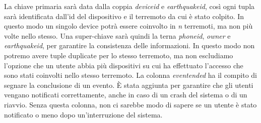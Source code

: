 \documentclass[main.tex]{subfiles}
\begin{document}
La chiave primaria sarà data dalla coppia \emph{deviceid} e \emph{earthquakeid}, così ogni tupla sarà identificata dall'id del dispositivo e il terremoto da cui è stato colpito. In questo modo un singolo device potrà essere coinvolto in \emph{n} terremoti, ma non più volte nello stesso.
Una super-chiave sarà quindi la terna \emph{phoneid}, \emph{owner} e \emph{earthquakeid}, per garantire la consistenza delle informazioni. In questo modo non potremo avere tuple duplicate per lo stesso terremoto, ma non escludiamo l'opzione che un utente abbia più dispositivi su cui ha effettuato l'accesso che sono stati coinvolti nello stesso terremoto.\newline
La colonna \emph{eventended} ha il compito di segnare la conclusione di un evento. È stata aggiunta per garantire che gli utenti vengano notificati correttamente, anche in caso di un crash del sistema o di un riavvio. Senza questa colonna, non ci sarebbe modo di sapere se un utente è stato notificato o meno dopo un'interruzione del sistema.
\end{document}
